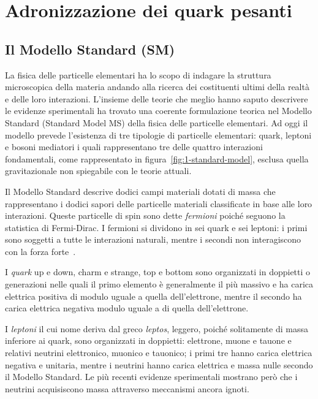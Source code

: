\chapter{Adronizzazione dei quark pesanti}
\label{cha:1-QCD}

\section{Il Modello Standard (SM)}
\label{sec:SM}
    La fisica delle particelle elementari ha lo scopo di indagare la struttura microscopica della materia andando alla ricerca dei costituenti ultimi della realtà e delle loro interazioni. L'insieme delle teorie che meglio hanno saputo descrivere le evidenze sperimentali ha trovato una coerente formulazione teorica nel Modello Standard (Standard Model MS) della fisica delle particelle elementari. Ad oggi il modello prevede l'esistenza di tre tipologie di particelle elementari: quark, leptoni e bosoni mediatori i quali rappresentano tre delle quattro interazioni fondamentali, come rappresentato in figura~\ref{fig:1-standard-model}, esclusa quella gravitazionale non spiegabile con le teorie attuali.
    
    Il Modello Standard descrive dodici campi materiali dotati di massa che rappresentano i dodici sapori delle particelle materiali classificate in base alle loro interazioni. Queste particelle di spin  sono dette \textit{fermioni} poiché seguono la statistica di Fermi-Dirac. I fermioni si dividono in sei quark e sei leptoni: i primi sono soggetti a tutte le interazioni naturali, mentre i secondi non interagiscono con la forza forte~\cite{CG_2007}.
    
    I \textit{quark} up e down, charm e strange, top e bottom sono organizzati in doppietti o generazioni nelle quali il primo elemento è generalmente il più massivo e ha carica elettrica positiva di modulo uguale a  quella dell'elettrone, mentre il secondo ha carica elettrica negativa modulo uguale a  di quella dell'elettrone.

    I \textit{leptoni} il cui nome deriva dal greco \textit{leptos}, leggero, poiché solitamente di massa inferiore ai quark, sono organizzati in doppietti: elettrone, muone e tauone e relativi neutrini elettronico, muonico e tauonico; i primi tre hanno carica elettrica negativa e unitaria, mentre i neutrini hanno carica elettrica e massa nulle secondo il Modello Standard. Le più recenti evidenze sperimentali mostrano però che i neutrini acquisiscono massa attraverso meccanismi ancora ignoti.

